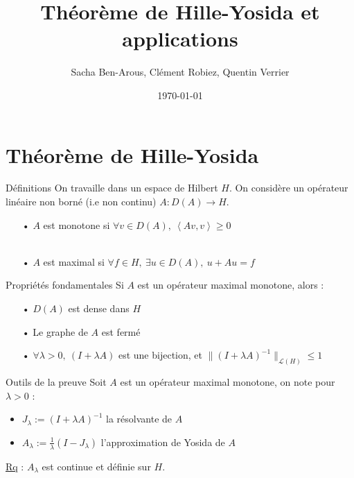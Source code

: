 \documentclass[10pt]{beamer}
\title{Théorème de Hille-Yosida et applications}
\date{\today}
\author{Sacha Ben-Arous, Clément Robiez, Quentin Verrier}
\institute{ENS Paris-Saclay}
\begin{document}
  \maketitle
\begin{frame}
\tableofcontents
\end{frame}  


\section{Théorème de Hille-Yosida}
\begin{frame}{Définitions}
On travaille dans un espace de Hilbert $H$. On considère un opérateur linéaire non borné (i.e non continu) $A : D(A)\rightarrow H$.
\begin{itemize}
\item[•]  $A$ est monotone si $\forall v \in D(A), \ \left<Av,v\right> \geq 0$ \\ ~ \\
\item[•] $A$ est maximal si $\forall f\in H, \ \exists u\in D(A), \ u + Au=f$ 
\end{itemize}
\end{frame}


\begin{frame}{Propriétés fondamentales}
Si $A$ est un opérateur maximal monotone, alors :
\begin{itemize}
\item[•]  $D(A)$ est dense dans $H$ 
\item[•] Le graphe de $A$ est fermé 
\item[•] $\forall \lambda > 0, \ (I+\lambda A)$ est une bijection, et $\|(I+\lambda A)^{-1}\|_{\mathcal{L}(H)} \leq 1 $
\end{itemize}
\end{frame}


\begin{frame}{Outils de la preuve}
Soit $A$ est un opérateur maximal monotone, on note pour $\lambda > 0$ :
\begin{itemize}
\item<1->[•] $J_{\lambda} := (I+\lambda A)^{-1}$ la résolvante de $A$
\item<1->[•] $A_{\lambda} := \frac{1}{\lambda}(I-J_{\lambda})$ l'approximation de Yosida de $A$ 
\end{itemize}
\underline{Rq} : $A_{\lambda}$ est continue et définie sur $H$. \\ ~ \\
\end{frame}
\end{document}
